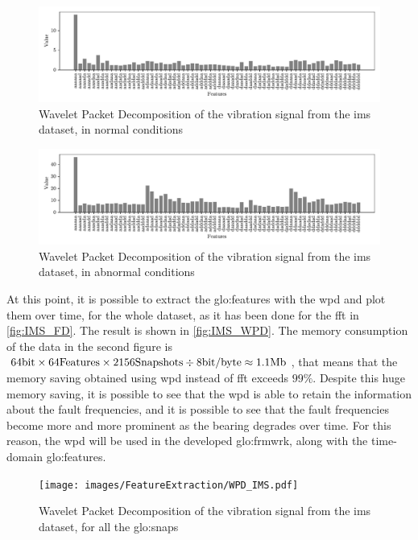 \begin{figure}
    \centering
    \includegraphics[width=\textwidth]{images/FeatureExtraction/IMS_WPD_health.pdf}
    \caption{Wavelet Packet Decomposition of the  vibration signal from the \gls{ims} dataset, in normal conditions}
    \label{fig:IMS_WPD_health}
\end{figure}

\begin{figure}
    \centering
    \includegraphics[width=\textwidth]{images/FeatureExtraction/IMS_WPD_fault.pdf}
    \caption{Wavelet Packet Decomposition of the  vibration signal from the \gls{ims} dataset, in abnormal conditions}
    \label{fig:IMS_WPD_fault}
\end{figure}

At this point, it is possible to extract the \gls{glo:feature}s with the \gls{wpd} and plot them over time, for the whole dataset, as it has been done for the \gls{fft} in \autoref{fig:IMS_FD}. The result is shown in \autoref{fig:IMS_WPD}. The memory consumption of the data in the second figure is $64 \si{\bit} \times 64 \text{Features} \times 2156 \text{Snapshots} \div 8 \text{bit/byte} \approx 1.1 \text{Mb}$, that means that the memory saving obtained using \gls{wpd} instead of \gls{fft} exceeds $99\%$. 
Despite this huge memory saving, it is possible to see that the \gls{wpd} is able to retain the information about the fault frequencies, and it is possible to see that the fault frequencies become more and more prominent as the bearing degrades over time. For this reason, the \gls{wpd} will be used in the developed \gls{glo:frmwrk}, along with the time-domain \gls{glo:feature}s.

\begin{figure}
    \centering
    \texttt{[image: images/FeatureExtraction/WPD\_IMS.pdf]}
    \caption{Wavelet Packet Decomposition of the  vibration signal from the \gls{ims} dataset, for all the \gls{glo:snap}s}
    \label{fig:IMS_WPD}
\end{figure}

